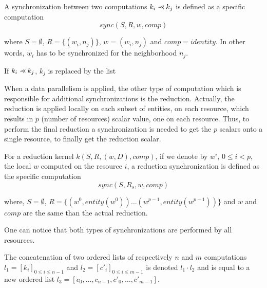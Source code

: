 \begin{mydef}
A synchronization between two computations $k_i \pprec k_j$ is defined as a specific computation 
\begin{equation*}
sync(S,R,w,comp)
\end{equation*}
\end{mydef}
where $S=\emptyset$, $R=\{(w_i,n_j)\}$, $w=(w_i,n_j)$ and $comp=identity$. In other words, $w_i$ has to be synchronized for the neighborhood $n_j$.

\begin{mydef}
If $k_i \pprec k_j$, $k_j$ is replaced by the list
\begin{equation*}
[sync(\emptyset,\{(w_i,n_j)\},(w_i,n_j),identity), k_j]
\end{equation*}
\end{mydef}

When a data parallelism is applied, the other type of computation which is responsible for additional synchronizations is the reduction. Actually, the reduction is applied locally on each subset of entities, on each resource, which results in $p$ (number of resources) scalar value, one on each resource. Thus, to perform the final reduction a synchronization is needed to get the $p$ scalars onto a single resource, to finally get the reduction scalar.

\begin{mydef}
For a reduction kernel $k(S,R,(w,D),comp)$, if we denote by $w^i$, $0 \leq i<p$, the local $w$ computed on the resource $i$, a reduction synchronization is defined as the specific computation 
\begin{equation*}
sync(S,R_s,w,comp)
\end{equation*}
\end{mydef}
where, $S=\emptyset$, $R=\{(w^0,entity(w^0)) \dots (w^{p-1},entity(w^{p-1}))\}$ and $w$ and $comp$ are the same than the actual reduction.

One can notice that both types of synchronizations are performed by all resources.

\begin{mydef}
The concatenation of two ordered lists of respectively $n$ and $m$ computations $l_1=[k_i]_{0 \leq i \leq n-1}$ and $l_2=[c'_i]_{0 \leq i \leq m-1}$ is denoted $l_1 \cdot l_2$ and is equal to a new ordered list $l_3=[c_0,\dots,c_{n-1},c'_0,\dots,c'_{m-1}]$.
\end{mydef}

